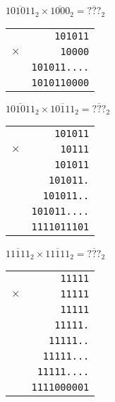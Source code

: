 \documentclass[12pt,a4paper,oneside,titlepage,final]{exam}
\begin{document}
\begin{questions}
\begin{parts}
\begin{subparts}
            \subpart[1] $ \overline{101011}_{2} \times
            \overline{1000}_{2} = \overline{???}_{2}$
            \begin{solution}[6cm]
                \centering
                \begin{tabular}{lr}
                    & \texttt{101011} \\
                    $\times$ & \texttt{10000} \\ \hline
                    & \texttt{101011....} \\ \hline
                    & \texttt{1010110000} \\
                \end{tabular}
            \end{solution}

            \subpart[1] $ \overline{101011}_{2} \times
            \overline{10111}_{2} = \overline{???}_{2}$
            \begin{solution}[6cm]
                \centering
                \begin{tabular}{lr}
                    & \texttt{101011} \\
                    $\times$ & \texttt{10111} \\ \hline
                    & \texttt{101011} \\
                    & \texttt{101011.} \\
                    & \texttt{101011..} \\
                    & \texttt{101011....} \\ \hline
                    & \texttt{1111011101} \\
                \end{tabular}
            \end{solution}

            \subpart[1] $ \overline{11111}_{2} \times
            \overline{11111}_{2} = \overline{???}_{2}$
            \begin{solution}[6cm]
                \centering
                \begin{tabular}{lr}
                    & \texttt{11111} \\
                    $\times$ & \texttt{11111} \\ \hline
                    & \texttt{11111} \\
                    & \texttt{11111.} \\
                    & \texttt{11111..} \\
                    & \texttt{11111...} \\
                    & \texttt{11111....} \\ \hline
                    & \texttt{1111000001} \\
                \end{tabular}
            \end{solution}
        \end{subparts}
    \end{parts}


\end{questions}
\end{document}
